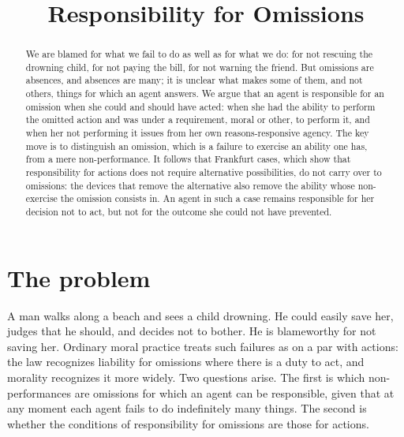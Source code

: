 \documentclass{situationist-preprint}
\title{Responsibility for Omissions}
\begin{document}
\maketitle

\begin{abstract}
We are blamed for what we fail to do as well as for what we do: for not rescuing the drowning child, for not paying the bill, for not warning the friend. But omissions are absences, and absences are many; it is unclear what makes some of them, and not others, things for which an agent answers. We argue that an agent is responsible for an omission when she could and should have acted: when she had the ability to perform the omitted action and was under a requirement, moral or other, to perform it, and when her not performing it issues from her own reasons-responsive agency. The key move is to distinguish an omission, which is a failure to exercise an ability one has, from a mere non-performance. It follows that Frankfurt cases, which show that responsibility for actions does not require alternative possibilities, do not carry over to omissions: the devices that remove the alternative also remove the ability whose non-exercise the omission consists in. An agent in such a case remains responsible for her decision not to act, but not for the outcome she could not have prevented.
\end{abstract}

\section{The problem}

A man walks along a beach and sees a child drowning. He could easily save her, judges that he should, and decides not to bother. He is blameworthy for not saving her. Ordinary moral practice treats such failures as on a par with actions: the law recognizes liability for omissions where there is a duty to act, and morality recognizes it more widely. Two questions arise. The first is which non-performances are omissions for which an agent can be responsible, given that at any moment each agent fails to do indefinitely many things. The second is whether the conditions of responsibility for omissions are those for actions.
\end{document}
